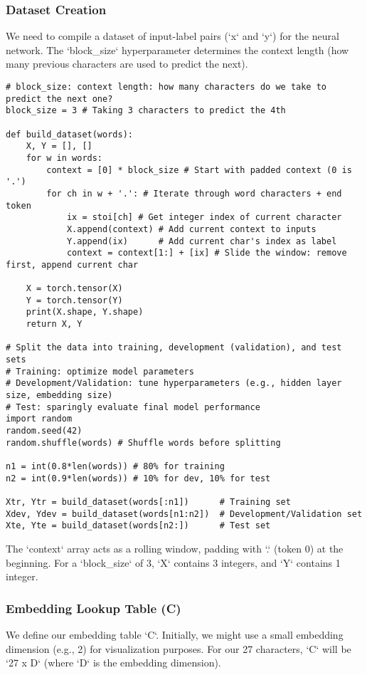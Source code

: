 \subsubsection{Dataset Creation}
We need to compile a dataset of input-label pairs (`x` and `y`) for the neural network. The `block_size` hyperparameter determines the context length (how many previous characters are used to predict the next).

\begin{lstlisting}[caption=Dataset Creation Function]
# block_size: context length: how many characters do we take to predict the next one?
block_size = 3 # Taking 3 characters to predict the 4th

def build_dataset(words):
    X, Y = [], []
    for w in words:
        context = [0] * block_size # Start with padded context (0 is '.')
        for ch in w + '.': # Iterate through word characters + end token
            ix = stoi[ch] # Get integer index of current character
            X.append(context) # Add current context to inputs
            Y.append(ix)      # Add current char's index as label
            context = context[1:] + [ix] # Slide the window: remove first, append current char

    X = torch.tensor(X)
    Y = torch.tensor(Y)
    print(X.shape, Y.shape)
    return X, Y

# Split the data into training, development (validation), and test sets
# Training: optimize model parameters
# Development/Validation: tune hyperparameters (e.g., hidden layer size, embedding size)
# Test: sparingly evaluate final model performance
import random
random.seed(42)
random.shuffle(words) # Shuffle words before splitting

n1 = int(0.8*len(words)) # 80% for training
n2 = int(0.9*len(words)) # 10% for dev, 10% for test

Xtr, Ytr = build_dataset(words[:n1])      # Training set
Xdev, Ydev = build_dataset(words[n1:n2])  # Development/Validation set
Xte, Yte = build_dataset(words[n2:])      # Test set
\end{lstlisting}

The `context` array acts as a rolling window, padding with `.` (token 0) at the beginning. For a `block_size` of 3, `X` contains 3 integers, and `Y` contains 1 integer.

\subsubsection{Embedding Lookup Table (C)}
We define our embedding table `C`. Initially, we might use a small embedding dimension (e.g., 2) for visualization purposes. For our 27 characters, `C` will be `27 x D` (where `D` is the embedding dimension).

